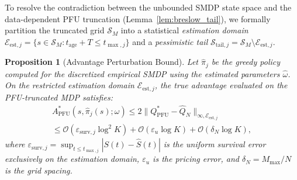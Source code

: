 \documentclass[letterpaper, 10 pt, conference]{IEEEconf}
\newtheorem{proposition}{Proposition}
\newcommand{\what}[1]{\widehat{#1}}
\begin{document}
To resolve the contradiction between the unbounded SMDP state space and the data-dependent PFU truncation (Lemma~\ref{lem:breslow_tail}), we formally partition the truncated grid $\mathcal{S}_M$ into a statistical \emph{estimation domain} $\mathcal{E}_{\mathrm{est},j} = \{s \in \mathcal{S}_M : t_{\mathrm{age}} + T \le t_{\max,j}\}$ and a \emph{pessimistic tail} $\mathcal{S}_{\mathrm{tail},j} = \mathcal{S}_M \setminus \mathcal{E}_{\mathrm{est},j}$.

\begin{proposition}[Advantage Perturbation Bound]
    \label{prop:perturbation}
    Let $\what{\pi}_j$ be the greedy policy computed for the discretized empirical SMDP using the estimated parameters $\what{\omega}$. On the restricted estimation domain $\mathcal{E}_{\mathrm{est},j}$, the true advantage evaluated on the PFU-truncated MDP satisfies:
    \begin{multline}
        \label{eq:perturbation_main}
        A^*_{\mathrm{PFU}}(s, \what{\pi}_j(s); \omega) \leq 2 \|Q^*_{\mathrm{PFU}} - \what{Q}_N\|_{\infty, \mathcal{E}_{\mathrm{est},j}} \\
        \leq \mathcal{O}(\varepsilon_{\mathrm{surv},j} \log^2 K) + \mathcal{O}(\varepsilon_u \log K) + \mathcal{O}(\delta_N \log K),
    \end{multline}
    where $\varepsilon_{\mathrm{surv},j} = \sup_{t \le t_{\max,j}} |S(t) - \what{S}(t)|$ is the uniform survival error exclusively on the estimation domain, $\varepsilon_u$ is the pricing error, and $\delta_N = M_{\max}/N$ is the grid spacing.
\end{proposition}
\end{document}
